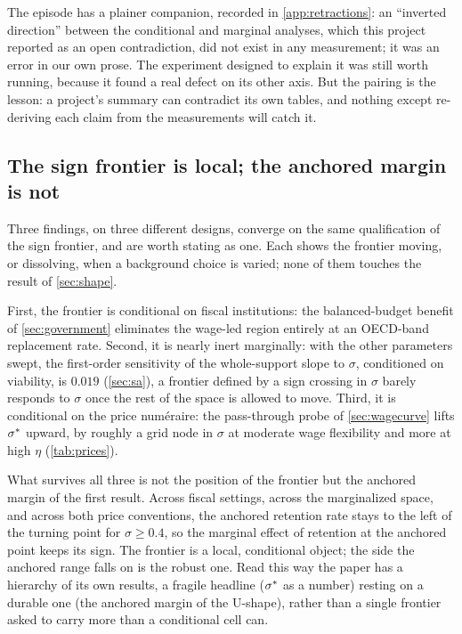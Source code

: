 The episode has a plainer companion, recorded in \cref{app:retractions}: an
``inverted direction'' between the conditional and marginal analyses, which
this project reported as an open contradiction, did not exist in any
measurement; it was an error in our own prose. The experiment designed to
explain it was still worth running, because it found a real defect on its other
axis. But the pairing is the lesson: a project's summary can contradict its own
tables, and nothing except re-deriving each claim from the measurements will
catch it.

\subsection{The sign frontier is local; the anchored margin is not}
\label{sec:frontierlocal}

Three findings, on three different designs, converge on the same qualification of
the sign frontier, and are worth stating as one. Each shows the frontier moving,
or dissolving, when a background choice is varied; none of them touches the result
of \cref{sec:shape}.

First, the frontier is conditional on fiscal institutions: the balanced-budget
benefit of \cref{sec:government} eliminates the wage-led region entirely at an
OECD-band replacement rate. Second, it is nearly inert marginally: with the other
parameters swept, the first-order sensitivity of the whole-support slope to
$\sigma$, conditioned on viability, is $0.019$ (\cref{sec:sa}), a frontier
defined by a sign crossing in $\sigma$ barely responds to $\sigma$ once the rest
of the space is allowed to move. Third, it is conditional on the price numéraire:
the pass-through probe of \cref{sec:wagecurve} lifts $\sigma^{\ast}$ upward, by roughly
a grid node in $\sigma$ at moderate wage flexibility and more at high $\eta$
(\cref{tab:prices}).

What survives all three is not the position of the frontier but the
anchored margin of the first result. Across fiscal settings, across the
marginalized space, and across both price conventions, the anchored retention
rate stays to the left of the turning point for $\sigma \ge 0.4$, so the
marginal effect of retention at the anchored point keeps its sign. The frontier
is a local, conditional object; the side the anchored range falls on is the robust
one. Read this way the paper has a hierarchy of its own results, a fragile
headline ($\sigma^{\ast}$ as a number) resting on a durable one (the anchored margin of
the U-shape), rather than a single frontier asked to carry more than a
conditional cell can.

